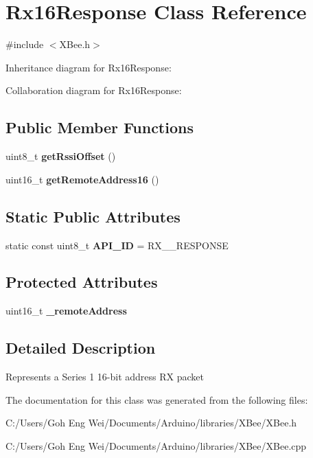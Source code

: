 \hypertarget{class_rx16_response}{}\section{Rx16\+Response Class Reference}
\label{class_rx16_response}


{\ttfamily \#include $<$X\+Bee.\+h$>$}



Inheritance diagram for Rx16\+Response\+:


Collaboration diagram for Rx16\+Response\+:
\subsection*{Public Member Functions}
\begin{DoxyCompactItemize}
\item 
\hypertarget{class_rx16_response_ac63deea5667857ec74285daf5fab6328}{}\label{class_rx16_response_ac63deea5667857ec74285daf5fab6328} 
uint8\+\_\+t {\bfseries get\+Rssi\+Offset} ()
\item 
\hypertarget{class_rx16_response_abd8853ab7edcfa686000e81ce17983c4}{}\label{class_rx16_response_abd8853ab7edcfa686000e81ce17983c4} 
uint16\+\_\+t {\bfseries get\+Remote\+Address16} ()
\end{DoxyCompactItemize}
\subsection*{Static Public Attributes}
\begin{DoxyCompactItemize}
\item 
\hypertarget{class_rx16_response_a093324030e7b616aab2eb3185e27c788}{}\label{class_rx16_response_a093324030e7b616aab2eb3185e27c788} 
static const uint8\+\_\+t {\bfseries A\+P\+I\+\_\+\+ID} = R\+X\+\_\+\_\+\+R\+E\+S\+P\+O\+N\+SE
\end{DoxyCompactItemize}
\subsection*{Protected Attributes}
\begin{DoxyCompactItemize}
\item 
\hypertarget{class_rx16_response_a8df57e3d897e22e4b6abdda7b2859123}{}\label{class_rx16_response_a8df57e3d897e22e4b6abdda7b2859123} 
uint16\+\_\+t {\bfseries \+\_\+remote\+Address}
\end{DoxyCompactItemize}


\subsection{Detailed Description}
Represents a Series 1 16-\/bit address RX packet 

The documentation for this class was generated from the following files\+:\begin{DoxyCompactItemize}
\item 
C\+:/\+Users/\+Goh Eng Wei/\+Documents/\+Arduino/libraries/\+X\+Bee/X\+Bee.\+h\item 
C\+:/\+Users/\+Goh Eng Wei/\+Documents/\+Arduino/libraries/\+X\+Bee/X\+Bee.\+cpp\end{DoxyCompactItemize}
